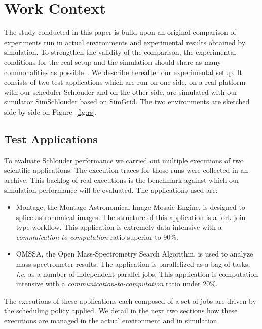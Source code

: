 \documentclass[10pt,conference,compsocconf]{IEEEtran}
\begin{document}
\section{Work Context}
\label{sec:work-context}

The  study conducted  in this  paper  is build  upon an  original comparison  of
experiments  run in  actual environments  and experimental  results obtained  by
simulation.   To strengthen  the validity  of the  comparison, the  experimental
conditions  for  the  real  setup  and  the  simulation  should  share  as  many
commonalities  as   possible~\cite{PucherGWK15}.   We  describe   hereafter  our
experimental setup.  It consists of two  test applications which are  run on one
side, on a real platform with our scheduler Schlouder and on the other side, are
simulated  with   our  simulator  SimSchlouder   based  on  SimGrid.    The  two
environments are sketched side by side on Figure~\ref{fig:rs}.

\subsection{Test Applications}\label{sc:setup}

To evaluate Schlouder performance we  carried out multiple executions of two
scientific applications. The  execution traces for those runs  were collected in
an archive. This  backlog of real executions is the  benchmark against which our
simulation performance will be evaluated. The applications used are:

\begin{itemize}
\item Montage\cite{montage2009},  the Montage Astronomical Image  Mosaic Engine,
  is designed to  splice astronomical images. The structure  of this application
  is a  fork-join type  workflow. This application  is extremely  data intensive
  with a \emph{commuication-to-computation} ratio superior to $90\%$.

\item OMSSA\cite{Geer2004}, the Open Mass-Spectrometry Search Algorithm, is used
  to analyze  mass-spectrometer results.  The application  is parallelized  as a
  bag-of-tasks, \textit{i.e.}  as a  number of  independent parallel  jobs. This
  application        is        computation        intensive        with        a
  \emph{communication-to-computation} ratio under $20\%$.
\end{itemize}

The executions of these applications each composed  of a set of jobs are driven
by the scheduling policy applied. We detail in the next two sections how these
executions are managed in the actual environment and in simulation.  
\end{document}
